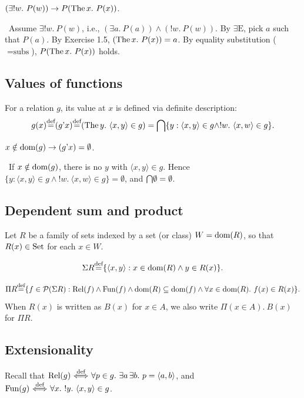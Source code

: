 \documentclass[10pt,a4paper]{article}
\begin{document}
\begin{exercise}
$(\exists !w.\ P(w)) \to P(\The x.\ P(x))$.
\end{exercise}
\myprf\ Assume $\exists !w.\ P(w)$, i.e., $(\exists a.\ P(a)) \land (!w.\ P(w))$. By $\exists\textrm{E}$, pick $a$ such that $P(a)$. By Exercise 1.5, $({\textrm{The\,}} x.\ P(x)) = a$. By equality substitution ($=\textrm{subs}$), $P({\textrm{The\,}} x.\ P(x))$ holds. \myqed

\subsection{Values of functions}
For a relation $g$, its value at $x$ is defined via definite description:
$$g(x) {\stackrel{{\textrm{def}}}{=}} (g{\textrm{'}} x) {\stackrel{{\textrm{def}}}{=}} ({\textrm{The\,}} y.\ \langle x, y\rangle \in g) = {\bigcap} \{y : \langle x,y\rangle \in g \land !w.\ \langle x,w\rangle \in g\}.$$

\begin{exercise}
$x\notin {\textrm{dom}}(g)\to (g{\textrm{'}} x)=\emptyset$.
\end{exercise}
\myprf\ If $x \notin {\textrm{dom}}(g)$, there is no $y$ with $\langle x,y\rangle \in g$. Hence $\{y : \langle x,y\rangle \in g \land !w.\ \langle x,w\rangle \in g\} = \emptyset$, and ${\bigcap} \emptyset = \emptyset$. \myqed

\subsection{Dependent sum and product}
Let $R$ be a family of sets indexed by a set (or class) $W = {\textrm{dom}}(R)$, so that $R(x) \in {\textrm{Set}}$ for each $x \in W$.
\begin{definition}
$$\Sigma R {\stackrel{{\textrm{def}}}{=}} \{\langle x, y\rangle : x \in {\textrm{dom}}(R) \land y\in R(x)\}.$$
\end{definition}
\begin{definition}
$$\Pi R {\stackrel{{\textrm{def}}}{=}} \{ f\in {\mathcal{P}}(\Sigma R) : {\textrm{Rel}}(f) \land {\textrm{Fun}}(f) \land {\textrm{dom}}(R)\subseteq {\textrm{dom}}(f) \land \forall x\in{\textrm{dom}}(R).\ f(x)\in R(x)\}.$$
When $R(x)$ is written as $B(x)$ for $x \in A$, we also write $\Pi(x \in A).\ B(x)$ for $\Pi R$.
\end{definition}

\subsection{Extensionality}
Recall that ${\textrm{Rel}}(g) {\stackrel{{\textrm{def}}}{\ \Longleftrightarrow\ }} \forall p \in g.\ \exists a\, \exists b.\ p = \langle a,b\rangle$, and ${\textrm{Fun}}(g) {\stackrel{{\textrm{def}}}{\ \Longleftrightarrow\ }} \forall x.\ !y.\ \langle x,y\rangle \in g$.
\end{document}
